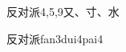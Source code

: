 \begin{entry}{反对派}{4,5,9}{⼜、⼨、⽔}
  \begin{phonetics}{反对派}{fan3dui4pai4}
  \end{phonetics}
\end{entry}
